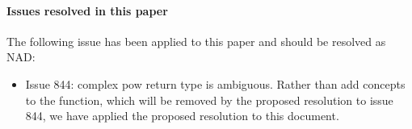 \documentclass[american,twoside]{book}
\begin{document}
\begin{titlepage}
\paragraph*{Issues resolved in this paper}
The following issue has been applied to this paper and should be resolved as NAD:
\begin{itemize}
\item Issue 844: complex pow return type is ambiguous. Rather than add
  concepts to the  function, which will be
  removed by the proposed resolution to issue 844, we have applied the
  proposed resolution to this document.
\end{itemize}
\end{titlepage}

\pagestyle{fancy}
\fancyhead[LE,RO]{\textbf{\rightmark}}
\fancyhead[RE]{\textbf{\leftmark\hspace{1em}\thepage}}
\fancyhead[LO]{\textbf{\thepage\hspace{1em}\leftmark}}


\renewcommand{\sectionmark}[1]{\markright{\thesection\hspace{1em}#1}}
\renewcommand{\chaptermark}[1]{\markboth{#1}{}}

\color{black}
\end{document}
